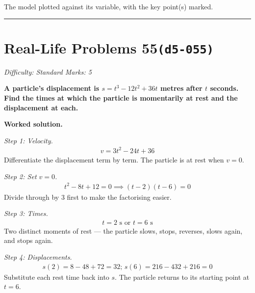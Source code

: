 \documentclass[11pt]{article}
\newcommand{\question}[1]{\par\medskip\noindent\textbf{#1}\par}
\begin{document}
\begin{center}
{
}
\end{center}
\small The model plotted against its variable, with the key point(s) marked.\normalsize

\medskip\hrule

\section*{Real-Life Problems 55\quad\small\texttt{(d5-055)}}
\textit{Difficulty: Standard \quad\textbar\quad Marks: 5}

\question{A particle's displacement is \( s = t^3 - 12t^2 + 36t \) metres after \( t \) seconds. Find the times at which the particle is momentarily at rest and the displacement at each.}

\textbf{Worked solution.}

\textit{Step 1: Velocity.}
\[\begin{gathered}
v = 3t^2 - 24t + 36
\end{gathered}\]
Differentiate the displacement term by term. The particle is at rest when \( v = 0 \).

\textit{Step 2: Set \( v = 0 \).}
\[\begin{gathered}
t^2 - 8t + 12 = 0 \implies (t-2)(t-6) = 0
\end{gathered}\]
Divide through by 3 first to make the factorising easier.

\textit{Step 3: Times.}
\[\begin{gathered}
t = 2 \text{ s or } t = 6 \text{ s}
\end{gathered}\]
Two distinct moments of rest --- the particle slows, stops, reverses, slows again, and stops again.

\textit{Step 4: Displacements.}
\[\begin{gathered}
s(2) = 8 - 48 + 72 = 32; \, s(6) = 216 - 432 + 216 = 0
\end{gathered}\]
Substitute each rest time back into \( s \). The particle returns to its starting point at \( t = 6 \).
\end{document}
